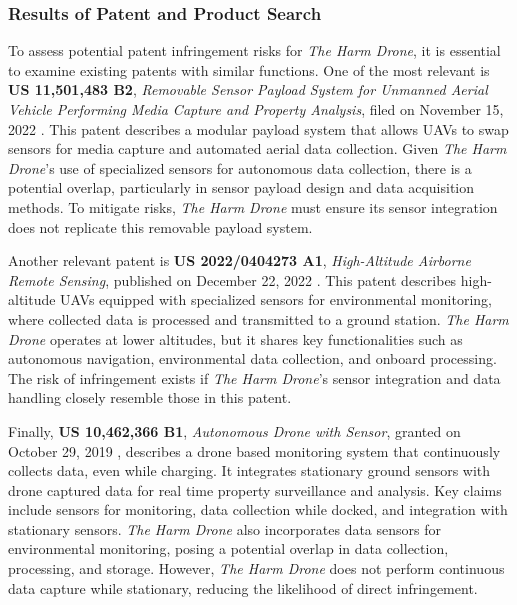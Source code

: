 \documentclass[12pt]{article}
\begin{document}
\subsubsection{Results of Patent and Product Search}

\par To assess potential patent infringement risks for \textit{The Harm Drone}, it is essential to examine existing patents with similar functions. One of the most relevant is \textbf{US 11,501,483 B2}, \textit{Removable Sensor Payload System for Unmanned Aerial Vehicle Performing Media Capture and Property Analysis}, filed on November 15, 2022 \cite{speasl2022payload}. This patent describes a modular payload system that allows UAVs to swap sensors for media capture and automated aerial data collection. Given \textit{The Harm Drone}’s use of specialized sensors for autonomous data collection, there is a potential overlap, particularly in sensor payload design and data acquisition methods. To mitigate risks, \textit{The Harm Drone} must ensure its sensor integration does not replicate this removable payload system.

\par Another relevant patent is \textbf{US 2022/0404273 A1}, \textit{High-Altitude Airborne Remote Sensing}, published on December 22, 2022 \cite{kendall2022remote}. This patent describes high-altitude UAVs equipped with specialized sensors for environmental monitoring, where collected data is processed and transmitted to a ground station. \textit{The Harm Drone} operates at lower altitudes, but it shares key functionalities such as autonomous navigation, environmental data collection, and onboard processing. The risk of infringement exists if \textit{The Harm Drone}’s sensor integration and data handling closely resemble those in this patent.

\par Finally, \textbf{US 10,462,366 B1}, \textit{Autonomous Drone with Sensor}, granted on October 29, 2019 \cite{bart2019autodrone}, describes a drone based monitoring system that continuously collects data, even while charging. It integrates stationary ground sensors with drone captured data for real time property surveillance and analysis. Key claims include sensors for monitoring, data collection while docked, and integration with stationary sensors. \textit{The Harm Drone} also incorporates data sensors for environmental monitoring, posing a potential overlap in data collection, processing, and storage. However, \textit{The Harm Drone} does not perform continuous data capture while stationary, reducing the likelihood of direct infringement.
\end{document}
